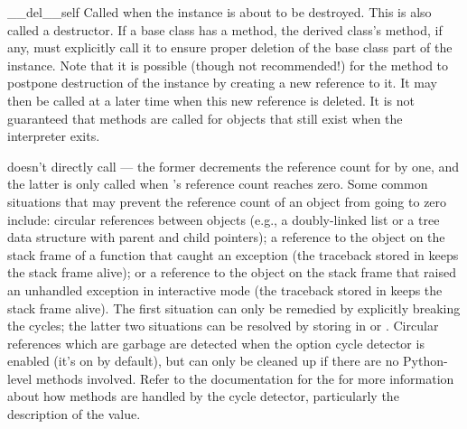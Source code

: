 \begin{methoddesc}[object]{__del__}{self}
Called when the instance is about to be destroyed.  This is also
called a destructor.  If a base class
has a  method, the derived class's 
method, if any,
must explicitly call it to ensure proper deletion of the base class
part of the instance.  Note that it is possible (though not recommended!)
for the 
method to postpone destruction of the instance by creating a new
reference to it.  It may then be called at a later time when this new
reference is deleted.  It is not guaranteed that
 methods are called for objects that still exist when
the interpreter exits.

\begin{notice}
 doesn't directly call
 --- the former decrements the reference count for
 by one, and the latter is only called when 's reference
count reaches zero.  Some common situations that may prevent the
reference count of an object from going to zero include: circular
references between objects (e.g., a doubly-linked list or a tree data
structure with parent and child pointers); a reference to the object
on the stack frame of a function that caught an exception (the
traceback stored in  keeps the stack frame
alive); or a reference to the object on the stack frame that raised an
unhandled exception in interactive mode (the traceback stored in
 keeps the stack frame alive).  The first
situation can only be remedied by explicitly breaking the cycles; the
latter two situations can be resolved by storing  in
 or .  Circular
references which are garbage are detected when the option cycle
detector is enabled (it's on by default), but can only be cleaned up
if there are no Python-level  methods involved.
Refer to the documentation for the  for more information about how
 methods are handled by the cycle detector,
particularly the description of the  value.
\end{notice}


\end{methoddesc}
